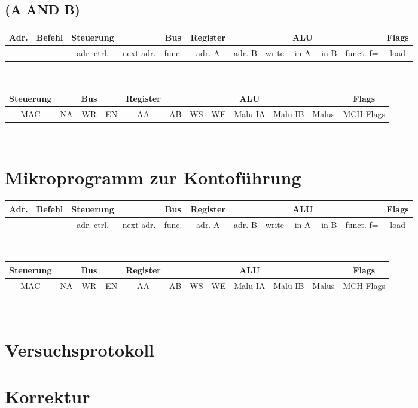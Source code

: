 \documentclass[paper=a4, fontsize=11pt]{scrartcl}
\numberwithin{equation}{section}
\numberwithin{figure}{section}
\numberwithin{table}{section}
\begin{document}

\subsection{(A AND B)}

\begin{tabular}{|c|c|cc|c|ccc|ccc|c|}
\hline
Adr. & Befehl &Steuerung & & Bus & Register & & & ALU & & & Flags \\
\hline
& & adr. ctrl. & next adr. & func. & adr. A & adr. B & write & in A & in B & funct. f= & load \\
\hline
\end{tabular} \\

\begin{tabular}{|cc|cc|cccc|ccc|c|}
\hline
Steuerung & & Bus & & Register & & & & ALU & & & Flags \\
\hline
MAC & NA & WR & EN & AA & AB & WS & WE & Malu IA & Malu IB & Malus & MCH Flags \\
\hline
\end{tabular} \\


\newpage

\section{Mikroprogramm zur Kontoführung}

\begin{tabular}{|c|c|cc|c|ccc|ccc|c|}
\hline
Adr. & Befehl &Steuerung & & Bus & Register & & & ALU & & & Flags \\
\hline
& & adr. ctrl. & next adr. & func. & adr. A & adr. B & write & in A & in B & funct. f= & load \\
\hline
\end{tabular} \\

\begin{tabular}{|cc|cc|cccc|ccc|c|}
\hline
Steuerung & & Bus & & Register & & & & ALU & & & Flags \\
\hline
MAC & NA & WR & EN & AA & AB & WS & WE & Malu IA & Malu IB & Malus & MCH Flags \\
\hline
\end{tabular} \\


\newpage

\section{Versuchsprotokoll}


\newpage

\section{Korrektur}
\end{document}
